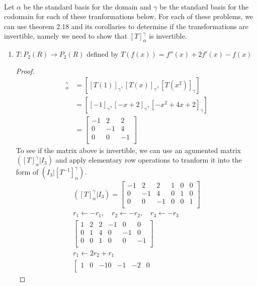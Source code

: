 \documentclass[11pt]{scrartcl}
\begin{document}
\-\\
Let $\alpha$ be the standard basis for the domain and $\gamma$ be the standard basis for the codomain for 
each of these tranformations below. For each of these problems, we can use theorem 2.18 and
its corollaries to determine if the transformations are invertible, namely we need to show 
that $[T]_{\alpha}^{\gamma}$ is invertible.
\begin{enumerate}[label=\alph*.]
	\item{
	$T : P_2(R) \rightarrow P_2(R)$ defined by $T(f(x)) = f''(x) + 2f'(x) - f(x)$
	\begin{proof}
	\begin{align*}
	[T]_{\alpha}^{\gamma} & = [[T(1)]_{\gamma}, [T(x)]_{\gamma}, [T(x^2)]_{\gamma}]\\
	& = [[-1]_{\gamma}, [-x + 2]_{\gamma}, [-x^2 + 4x + 2]_{\gamma}]\\
	& = \begin{bmatrix}
		-1 & 2 & 2\\
		0 & -1 & 4 \\ 
		0 & 0 & -1 \\
	\end{bmatrix}
	\end{align*}
	To see if the matrix above is invertible, we can use an agumented matrix 
	$([T]_{\alpha}^{\gamma}|I_3)$ and apply elementary row operations to tranform it 
	into the form of $(I_3|[T^{-1}]_{\alpha}^{\gamma})$.
	\begin{align*}
	([T]_{\alpha}^{\gamma}|I_3)=
	\left[\begin{array}{ccc|ccc}
	-1 & 2 & 2 & 1 & 0 & 0 \\ 
	0 & -1 & 4 & 0 & 1 & 0 \\ 
	0 & 0 & -1 & 0 & 0 & 1 \\ 
	\end{array}\right]\\
	r_1 \leftarrow -r_1,\quad r_2 \leftarrow -r_2, \quad r_3 \leftarrow -r_3\\
	\left[\begin{array}{ccc|ccc}
	1 & 2 & 2 & -1 & 0 & 0 \\ 
	0 & 1 & 4 & 0 & -1 & 0 \\ 
	0 & 0 & 1 & 0 & 0 & -1 \\ 
	\end{array}\right]\\
	r_1 \leftarrow 2r_2 + r_1\\
	\left[\begin{array}{ccc|ccc}
	1 & 0 & -10 & -1 & -2 & 0 \\ 

\end{array}
\end{align*}
\end{proof}}
\end{enumerate}
\end{document}
